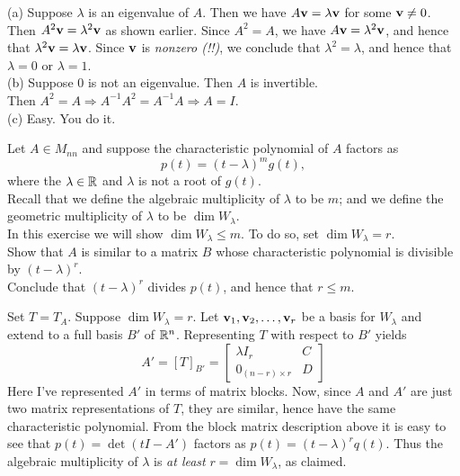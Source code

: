 \ee 
\begin{solution}
\noindent 
(a) Suppose $\lambda$ is an eigenvalue of $A$. Then we have $A{\mathbf v}=\lambda {\mathbf v}$ for some ${\mathbf v}\ne 0$. Then $A^2{\mathbf v}=\lambda^2{\mathbf v}$ as shown earlier. Since $A^2=A$, we have $A{\mathbf v}=\lambda^2{\mathbf v}$, and hence that $\lambda^2{\mathbf v}=\lambda{\mathbf v}$. Since ${\mathbf v}$ is {\em nonzero (!!)}, we conclude that $\lambda^2=\lambda$, and hence that $\lambda=0$ or $\lambda=1$. 
\\
(b) Suppose $0$ is not an eigenvalue. Then $A$ is invertible. \\
Then $A^2=A\Rightarrow A^{-1}A^2=A^{-1}A\Rightarrow A=I$. 
\\
(c) Easy. You do it. 
\end{solution}
\ii Let $A\in M_{nn}$ and suppose the characteristic polynomial of $A$ factors as 
\[
p(t)=(t-\lambda)^{m}g(t),
\]
where the $\lambda\in{\mathbb R}$ and $\lambda$ is not a root of $g(t)$.
\\
Recall that we define the algebraic multiplicity of $\lambda$ to be $m$; and we define the geometric multiplicity of $\lambda$ to be $\dim W_\lambda$. 
\\
In this exercise we will show $\dim W_{\lambda}\leq m$.  To do so, set $\dim W_{\lambda}=r$. 
\\
Show that $A$ is similar to a matrix $B$ whose characteristic polynomial is divisible by $(t-\lambda)^r$. 
\\
Conclude that $(t-\lambda)^r$ divides $p(t)$, and hence that $r\leq m$. 
\\
\begin{solution}
\noindent Set $T=T_A$. Suppose $\dim W_\lambda=r$. Let ${\mathbf v}_1,{\mathbf v}_2,\dots, {\mathbf v}_r$ be a basis for $W_\lambda$ and extend to a full basis $B'$ of ${\mathbb R}^n$. Representing $T$ with respect to $B'$ yields 
\[
A'=[T]_{B'}=\begin{bmatrix}
\lambda I_{r}&C\\
0_{(n-r)\times r}&D
\end{bmatrix} 
\]
Here I've represented $A'$ in terms of matrix blocks. Now, since $A$ and $A'$ are just two matrix representations of $T$, they are similar, hence have the same characteristic polynomial. From the block matrix description above it is easy to see that $p(t)=\det(tI-A')$ factors as $p(t)=(t-\lambda)^rq(t)$. Thus the algebraic multiplicity of $\lambda$ is {\em at least} $r=\dim W_\lambda$, as claimed. 
\end{solution}

